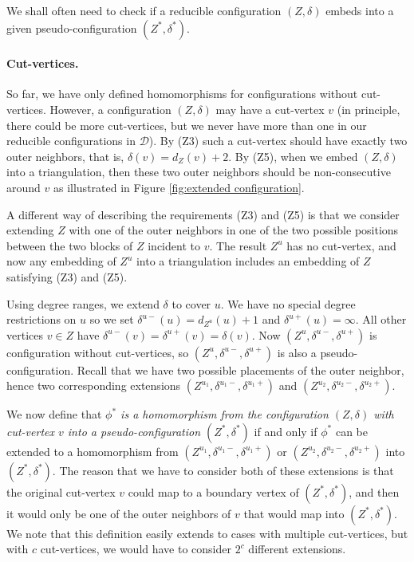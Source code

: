 \documentclass[10pt,a4paper]{article}
\def\cD{{\mathcal D}}
\begin{document}
We shall often need to check if a reducible configuration $(Z,\delta)$ embeds into a given pseudo-configuration $(Z^*,\delta^*)$. 

\paragraph{Cut-vertices.}
So far, we have only defined homomorphisms for configurations without cut-vertices. However, a
configuration $(Z,\delta)$
may have a cut-vertex $v$ (in principle, there could be more cut-vertices, but we never have more than one in our reducible configurations in $\cD$). By (Z3) such a cut-vertex should
have exactly two outer neighbors, that is, $\delta(v)=d_Z(v)+2$. By (Z5), when we embed $(Z,\delta)$ into a triangulation, then these two outer neighbors should be non-consecutive around $v$ as illustrated in Figure \ref{fig:extended configuration}.

A different way of describing the requirements (Z3) and (Z5)
is that we consider 
extending 
$Z$ with one of the outer neighbors in one of the two possible positions between the two blocks of $Z$ incident to $v$. The
result $Z^u$ has no cut-vertex, and now any 
embedding of $Z^u$ into a triangulation includes
an embedding of $Z$ satisfying (Z3) and (Z5).

Using degree ranges, we 
extend $\delta$ to 
cover $u$. We have no
special degree restrictions on $u$ so we set $\delta^{u-}(u)=d_{Z^u}(u)+1$ and $\delta^{u+}(u)=\infty$. All other
vertices $v\in Z$ have $\delta^{u-}(v)=\delta^{u+}(v)=\delta(v)$. Now $(Z^u,\delta^{u-},\delta^{u+})$ is configuration without cut-vertices, so $(Z^u,\delta^{u-},\delta^{u+})$ is also a pseudo-configuration. 
Recall that we have two possible placements of the outer neighbor, hence two corresponding
extensions 
$(Z^{u_1},\delta^{u_1-},\delta^{u_1+})$ and  
$(Z^{u_2},\delta^{u_2-},\delta^{u_2+})$.

We now define that 
\emph{$\phi^*$ is a homomorphism from the configuration $(Z,\delta)$
with cut-vertex $v$ into a
pseudo-configuration $(Z^*,\delta^*)$}
if and only 
if $\phi^*$ can be extended to a homomorphism from
$(Z^{u_1},\delta^{u_1-},\delta^{u_1+})$ or $(Z^{u_2},\delta^{u_2-},\delta^{u_2+})$ into $(Z^*,\delta^*)$. The reason that we have to consider both of these extensions is that the original cut-vertex $v$ could map to a boundary vertex of $(Z^*,\delta^*)$, and then it would only be one of the outer neighbors of $v$ that would map into
$(Z^*,\delta^*)$. We note that this definition easily extends to cases with multiple cut-vertices, but with $c$ cut-vertices, we would have to consider $2^c$
different extensions. 
\end{document}
